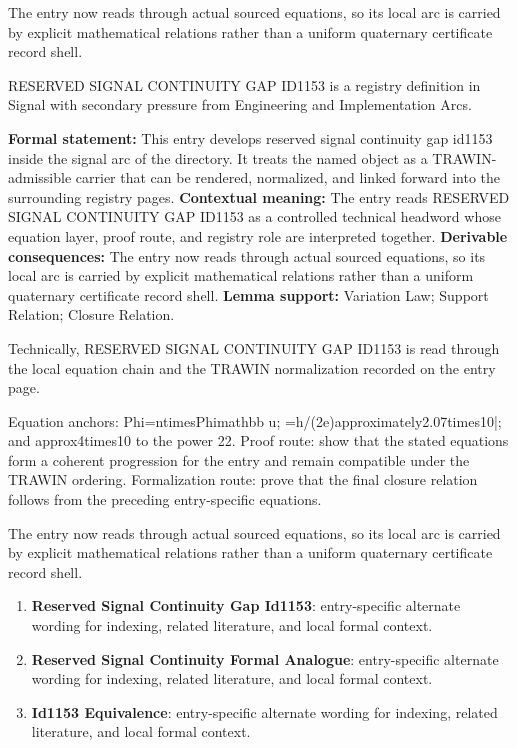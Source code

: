 The entry now reads through actual sourced equations, so its local arc is carried by explicit mathematical relations rather than a uniform quaternary certificate record shell.
\clearpage


\begingroup\small
{}
RESERVED SIGNAL CONTINUITY GAP ID1153 is a registry definition in Signal with secondary pressure from Engineering and Implementation Arcs.

\begingroup\footnotesize\setlength{\emergencystretch}{3em}\sloppy
\textbf{Formal statement:} This entry develops reserved signal continuity gap id1153 inside the signal arc of the directory. It treats the named object as a TRAWIN-admissible carrier that can be rendered, normalized, and linked forward into the surrounding registry pages. \textbf{Contextual meaning:} The entry reads RESERVED SIGNAL CONTINUITY GAP ID1153 as a controlled technical headword whose equation layer, proof route, and registry role are interpreted together. \textbf{Derivable consequences:} The entry now reads through actual sourced equations, so its local arc is carried by explicit mathematical relations rather than a uniform quaternary certificate record shell. \textbf{Lemma support:} Variation Law; Support Relation; Closure Relation.\par
\endgroup

Technically, RESERVED SIGNAL CONTINUITY GAP ID1153 is read through the local equation chain and the TRAWIN normalization recorded on the entry page.

Equation anchors: Phi=ntimesPhimathbb u; =h/(2e)approximately2.07times10|; and approx4times10 to the power 22. Proof route: show that the stated equations form a coherent progression for the entry and remain compatible under the TRAWIN ordering. Formalization route: prove that the final closure relation follows from the preceding entry-specific equations.

The entry now reads through actual sourced equations, so its local arc is carried by explicit mathematical relations rather than a uniform quaternary certificate record shell.
\endgroup

\begin{enumerate}[leftmargin=1.6em,itemsep=6pt,topsep=4pt]
\item \textbf{Reserved Signal Continuity Gap Id1153}: entry-specific alternate wording for indexing, related literature, and local formal context.
\item \textbf{Reserved Signal Continuity Formal Analogue}: entry-specific alternate wording for indexing, related literature, and local formal context.
\item \textbf{Id1153 Equivalence}: entry-specific alternate wording for indexing, related literature, and local formal context.
\end{enumerate}

